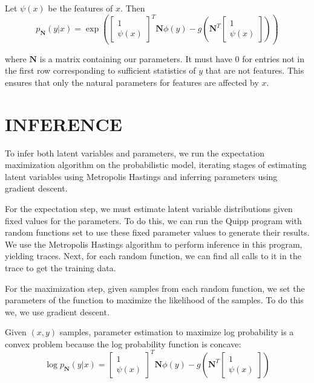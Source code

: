 \documentclass{article}
\begin{document}
    Let $\psi(x)$ be the features of $x$.  Then
    $$p_{\mathbf{N}}(y | x) = \exp\left(\begin{bmatrix} 1 \\ \psi(x) \end{bmatrix} ^T \mathbf{N} \phi(y) - g\left(\mathbf{N}^T \begin{bmatrix} 1 \\ \psi(x) \end{bmatrix}\right)\right)$$

    where $\mathbf{N}$ is a matrix containing our parameters.  It must have 0 for entries not in the first
    row corresponding to sufficient statistics of $y$ that are not features.  This ensures that only the
    natural parameters for features are affected by $x$.


  \section{INFERENCE}

    To infer both latent variables and parameters, we run the
    expectation maximization algorithm on the probabilistic model, iterating stages of
    estimating latent variables using Metropolis Hastings and inferring
    parameters using gradient descent.

    For the expectation step, we must estimate latent variable distributions given
    fixed values for the parameters.  To do this, we can run the Quipp program
    with random functions set to use these fixed parameter values to generate their results.
    We use the Metropolis Hastings algorithm to perform inference in this program,
    yielding traces.  Next, for each random function, we can find all calls
    to it in the trace to get the training data.

    For the maximization step, given samples from each random function, we set the
    parameters of the function to maximize the likelihood of the samples.  To do this we,
    we use gradient descent.

    Given $(x, y)$ samples, parameter estimation to maximize log probability is a convex
    problem because the log probability function is concave:
    $$\log p_{\mathbf{N}}(y | x) = \begin{bmatrix} 1 \\ \psi(x) \end{bmatrix} ^T \mathbf{N} \phi(y) - g\left(\mathbf{N}^T \begin{bmatrix} 1 \\ \psi(x) \end{bmatrix}\right)$$
\end{document}
